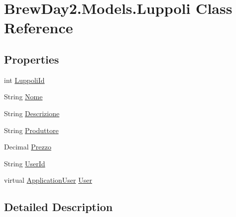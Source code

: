 \hypertarget{class_brew_day2_1_1_models_1_1_luppoli}{}\section{Brew\+Day2.\+Models.\+Luppoli Class Reference}
\label{class_brew_day2_1_1_models_1_1_luppoli}
\subsection*{Properties}
\begin{DoxyCompactItemize}
\item 
int \mbox{\hyperlink{class_brew_day2_1_1_models_1_1_luppoli_ad43ee4a023748030cd1c921a0f7396c7}{Luppoli\+Id}}
\item 
String \mbox{\hyperlink{class_brew_day2_1_1_models_1_1_luppoli_a4421677ca66e0eb885a22a68345e940c}{Nome}}
\item 
String \mbox{\hyperlink{class_brew_day2_1_1_models_1_1_luppoli_a74bf965b69cf14a395f4c3b134e6e653}{Descrizione}}
\item 
String \mbox{\hyperlink{class_brew_day2_1_1_models_1_1_luppoli_a707f1195789d29046bb19192614ce79d}{Produttore}}
\item 
Decimal \mbox{\hyperlink{class_brew_day2_1_1_models_1_1_luppoli_a365218bede5a3a65d56af077eece47f2}{Prezzo}}
\item 
String \mbox{\hyperlink{class_brew_day2_1_1_models_1_1_luppoli_aff73c52523e0a6aae8cd983ad7955426}{User\+Id}}
\item 
virtual \mbox{\hyperlink{class_brew_day2_1_1_models_1_1_application_user}{Application\+User}} \mbox{\hyperlink{class_brew_day2_1_1_models_1_1_luppoli_acf3b29b45a4f9a747ce2b40bcb2959e7}{User}}
\end{DoxyCompactItemize}


\subsection{Detailed Description}


